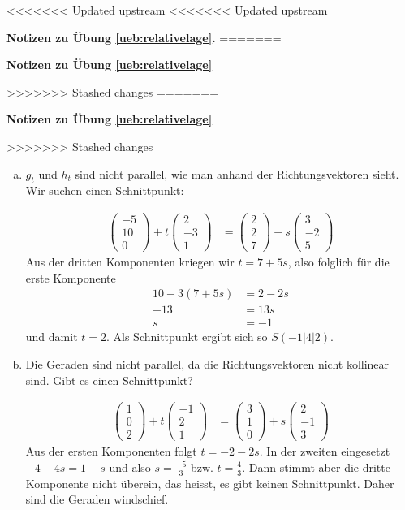 \documentclass[%
11pt,%
twoside,%
titlepage,%
<<<<<<< Updated upstream
<<<<<<< Updated upstream
german,%
=======
swissgerman,%
>>>>>>> Stashed changes
=======
swissgerman,%
>>>>>>> Stashed changes
headsepline%
]{scrartcl}
\newcommand{\faReturnGray}{\textcolor{gray}{\faMailReply}} %
\newcommand{\faReturnGray}{\textcolor{gray}{\faMailReply}} %
\theoremstyle{definition}
\theoremstyle{plain}
\newcommand{\concatueb}[1]{ueb:#1}%
\newcommand{\concatlsg}[1]{lsg:#1}%
\newenvironment{lsg}[1]{%
<<<<<<< Updated upstream
<<<<<<< Updated upstream
    \par\noindent\textbf{Notizen zu Übung \ref{\concatueb{#1}}.}%
    \label{\concatlsg{#1}}
=======
    \par\noindent\textbf{Notizen zu Übung \ref{\concatueb{#1}}}\label{\concatlsg{#1}}
    \hfill\hyperref[\concatueb{#1}]{\faReturnGray}\par %
>>>>>>> Stashed changes
=======
    \par\noindent\textbf{Notizen zu Übung \ref{\concatueb{#1}}}\label{\concatlsg{#1}}
    \hfill\hyperref[\concatueb{#1}]{\faReturnGray}\par %
>>>>>>> Stashed changes
}{%
    \par%
}
\begin{document}
\begin{lsg}{relativelage}
\begin{enumerate}[a)]
    \item $g_t$ und $h_t$ sind nicht parallel, wie man anhand der Richtungsvektoren sieht. Wir suchen einen Schnittpunkt:

    \begin{align*}
        \begin{pmatrix}-5\\10\\0\end{pmatrix}+t\begin{pmatrix}2\\-3\\1\end{pmatrix} &= \begin{pmatrix}2\\2\\7\end{pmatrix}+s\begin{pmatrix}3\\-2\\5\end{pmatrix}
    \end{align*}
    Aus der dritten Komponenten kriegen wir $t=7+5s$, also folglich für die erste Komponente
    \begin{align*}
        10-3(7+5s) &= 2-2s\\
        -13 &= 13s\\
        s &= -1
    \end{align*}
    und damit $t=2$. Als Schnittpunkt ergibt sich so $S(-1|4|2)$.

    \item Die Geraden sind nicht parallel, da die Richtungsvektoren nicht kollinear sind. Gibt es einen Schnittpunkt?

    \begin{align*}
    \begin{pmatrix}1\\0\\2\end{pmatrix}+t\begin{pmatrix}-1\\2\\1\end{pmatrix} &= \begin{pmatrix}3\\1\\0\end{pmatrix}+s\begin{pmatrix}2\\-1\\3\end{pmatrix}
    \end{align*}
    Aus der ersten Komponenten folgt $t=-2-2s$. In der zweiten eingesetzt $-4-4s=1-s$ und also $s=\frac{-5}{3}$ bzw. $t=\frac{4}{3}$. Dann stimmt aber die dritte Komponente nicht überein, das heisst, es gibt keinen Schnittpunkt. Daher sind die Geraden windschief.
\end{enumerate}
\end{lsg}
\end{document}
